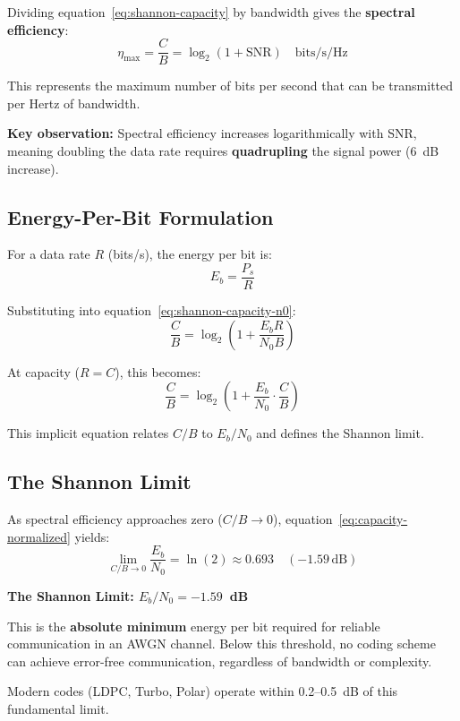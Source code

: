 Dividing equation~\eqref{eq:shannon-capacity} by bandwidth gives the \textbf{spectral efficiency}:
\begin{equation}
\eta_{\max} = \frac{C}{B} = \log_2(1 + \mathrm{SNR}) \quad \text{bits/s/Hz}
\label{eq:spectral-efficiency}
\end{equation}

This represents the maximum number of bits per second that can be transmitted per Hertz of bandwidth.

\textbf{Key observation:} Spectral efficiency increases logarithmically with SNR, meaning doubling the data rate requires \textbf{quadrupling} the signal power (6~dB increase).

\subsection{Energy-Per-Bit Formulation}

For a data rate $R$ (bits/s), the energy per bit is:
\begin{equation}
E_b = \frac{P_s}{R}
\label{eq:energy-per-bit}
\end{equation}

Substituting into equation~\eqref{eq:shannon-capacity-n0}:
\begin{equation}
\frac{C}{B} = \log_2\left(1 + \frac{E_b R}{N_0 B}\right)
\label{eq:capacity-eb-n0}
\end{equation}

At capacity ($R = C$), this becomes:
\begin{equation}
\frac{C}{B} = \log_2\left(1 + \frac{E_b}{N_0} \cdot \frac{C}{B}\right)
\label{eq:capacity-normalized}
\end{equation}

This implicit equation relates $C/B$ to $E_b/N_0$ and defines the Shannon limit.

\subsection{The Shannon Limit}

As spectral efficiency approaches zero ($C/B \rightarrow 0$), equation~\eqref{eq:capacity-normalized} yields:
\begin{equation}
\lim_{C/B \to 0} \frac{E_b}{N_0} = \ln(2) \approx 0.693 \quad (-1.59\,\text{dB})
\label{eq:shannon-limit}
\end{equation}

\begin{keyconcept}
\textbf{The Shannon Limit: $E_b/N_0 = -1.59$~dB}

This is the \textbf{absolute minimum} energy per bit required for reliable communication in an AWGN channel. Below this threshold, no coding scheme can achieve error-free communication, regardless of bandwidth or complexity.

Modern codes (LDPC, Turbo, Polar) operate within 0.2--0.5~dB of this fundamental limit.
\end{keyconcept}

